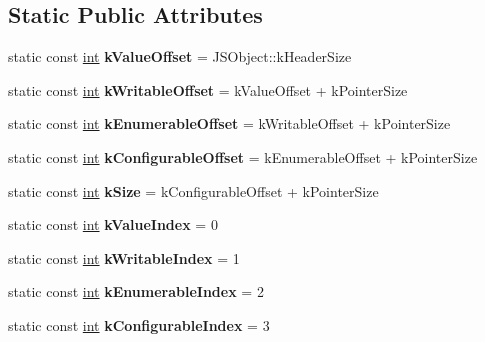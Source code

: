 \subsection*{Static Public Attributes}
\begin{DoxyCompactItemize}
\item 
\mbox{\label{classv8_1_1internal_1_1JSDataPropertyDescriptor_a6884763d4a5c2789b65db05de495ec78}} 
static const \mbox{\hyperlink{classint}{int}} {\bfseries k\+Value\+Offset} = J\+S\+Object\+::k\+Header\+Size
\item 
\mbox{\label{classv8_1_1internal_1_1JSDataPropertyDescriptor_aeee347bbad1434ac245775a692c69dbb}} 
static const \mbox{\hyperlink{classint}{int}} {\bfseries k\+Writable\+Offset} = k\+Value\+Offset + k\+Pointer\+Size
\item 
\mbox{\label{classv8_1_1internal_1_1JSDataPropertyDescriptor_ad91a34ea161422daa3173abb1601d1c5}} 
static const \mbox{\hyperlink{classint}{int}} {\bfseries k\+Enumerable\+Offset} = k\+Writable\+Offset + k\+Pointer\+Size
\item 
\mbox{\label{classv8_1_1internal_1_1JSDataPropertyDescriptor_a1f3a3bdad8ac99364898f01b2d23db85}} 
static const \mbox{\hyperlink{classint}{int}} {\bfseries k\+Configurable\+Offset} = k\+Enumerable\+Offset + k\+Pointer\+Size
\item 
\mbox{\label{classv8_1_1internal_1_1JSDataPropertyDescriptor_a37d3ebd512c7f6040eca3be6519bf825}} 
static const \mbox{\hyperlink{classint}{int}} {\bfseries k\+Size} = k\+Configurable\+Offset + k\+Pointer\+Size
\item 
\mbox{\label{classv8_1_1internal_1_1JSDataPropertyDescriptor_a4166d6de9d203399e1517c727287060b}} 
static const \mbox{\hyperlink{classint}{int}} {\bfseries k\+Value\+Index} = 0
\item 
\mbox{\label{classv8_1_1internal_1_1JSDataPropertyDescriptor_a446bf010d5d4bb2fc786efa1a1e66f8a}} 
static const \mbox{\hyperlink{classint}{int}} {\bfseries k\+Writable\+Index} = 1
\item 
\mbox{\label{classv8_1_1internal_1_1JSDataPropertyDescriptor_aeb5380e3cefdc698ddcfc0613de24e29}} 
static const \mbox{\hyperlink{classint}{int}} {\bfseries k\+Enumerable\+Index} = 2
\item 
\mbox{\label{classv8_1_1internal_1_1JSDataPropertyDescriptor_a8829176ac6384f9a0671c422cc69c8ab}} 
static const \mbox{\hyperlink{classint}{int}} {\bfseries k\+Configurable\+Index} = 3
\end{DoxyCompactItemize}
